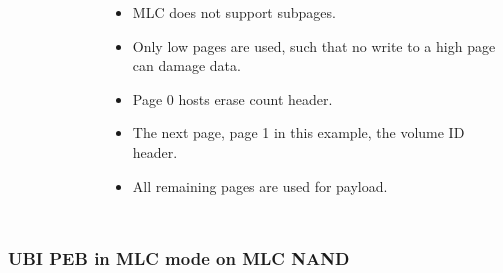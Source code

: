\documentclass[aspectratio=169,obeyspaces,spaces,hyphens,dvipsnames]{beamer}
\begin{document}
\begin{frame}[fragile]
\begin{columns}
\begin{figure}
     \end{figure}
    \begin{itemize}
    \item MLC does not support subpages.
    \item Only low pages are used, such that no write to a high page can damage data.
    \item Page 0 hosts erase count header.
    \item The next page, page 1 in this example, the volume ID header.
    \item All remaining pages are used for payload.
    \end{itemize}
   \end{columns}
\end{frame}

\begin{frame}[fragile]
\frametitle{UBI PEB in MLC mode on MLC NAND}
   \begin{columns}
     \begin{figure}

\end{figure}
\end{columns}
\end{frame}
\end{document}
